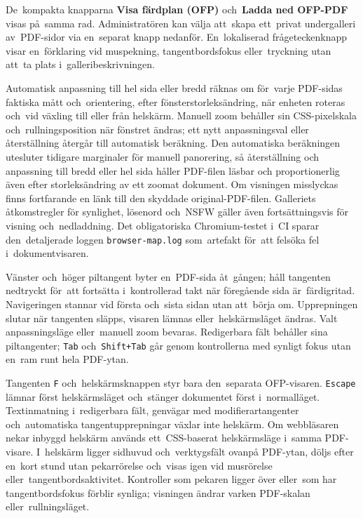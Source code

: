 \documentclass[11pt,a4paper]{article}
\newcommand{\ui}[1]{\textbf{#1}}
\newcommand{\codeword}[1]{\nolinkurl{#1}}
\begin{document}
De~kompakta knapparna \ui{Visa färdplan (OFP)} och~\ui{Ladda ned OFP-PDF} visas
på~samma rad. Administratören kan välja att~skapa ett~privat undergalleri
av~PDF-sidor via en~separat knapp nedanför. En~lokaliserad frågeteckenknapp
visar en~förklaring vid muspekning, tangentbordsfokus eller~tryckning utan
att~ta plats i~galleribeskrivningen.

Automatisk anpassning till hel sida eller bredd räknas om för~varje PDF-sidas
faktiska mått och~orientering, efter fönsterstorleksändring, när enheten roteras
och~vid växling till eller från helskärm. Manuell zoom behåller sin
CSS-pixelskala och~rullningsposition när fönstret ändras; ett nytt
anpassningsval eller återställning återgår till automatisk beräkning. Den
automatiska beräkningen utesluter tidigare marginaler för manuell panorering, så
återställning och anpassning till bredd eller hel sida håller PDF-filen läsbar
och proportionerlig även efter storleksändring av ett zoomat dokument. Om
visningen misslyckas finns fortfarande en länk till den skyddade
original-PDF-filen. Galleriets åtkomstregler för synlighet, lösenord och~NSFW
gäller även fortsättningsvis för visning och~nedladdning. Det obligatoriska
Chromium-testet i~CI sparar den~detaljerade loggen \codeword{browser-map.log}
som~artefakt för~att felsöka fel i~dokumentvisaren.

Vänster och~höger piltangent byter en~PDF-sida åt~gången; håll tangenten
nedtryckt för~att fortsätta i~kontrollerad takt när föregående sida
är~färdigritad. Navigeringen stannar vid första och~sista sidan utan att~börja
om. Upprepningen slutar när tangenten släpps, visaren lämnas
eller~helskärmsläget ändras. Valt anpassningsläge eller~manuell zoom bevaras.
Redigerbara fält behåller sina piltangenter; \codeword{Tab}
och~\codeword{Shift+Tab} går genom kontrollerna med synligt fokus utan en~ram
runt hela PDF-ytan.

Tangenten \codeword{F} och~helskärmsknappen styr bara den~separata OFP-visaren.
\codeword{Escape} lämnar först helskärmsläget och~stänger dokumentet först
i~normalläget. Textinmatning i~redigerbara fält, genvägar med
modifierartangenter och~automatiska tangentupprepningar växlar inte helskärm. Om
webbläsaren nekar inbyggd helskärm används ett~CSS-baserat helskärmsläge i~samma
PDF-visare. I~helskärm ligger sidhuvud och~verktygsfält ovanpå PDF-ytan, döljs
efter en~kort stund utan pekarrörelse och~visas igen vid musrörelse
eller~tangentbordsaktivitet. Kontroller som pekaren ligger över eller~som har
tangentbordsfokus förblir synliga; visningen ändrar varken PDF-skalan
eller~rullningsläget.
\end{document}
